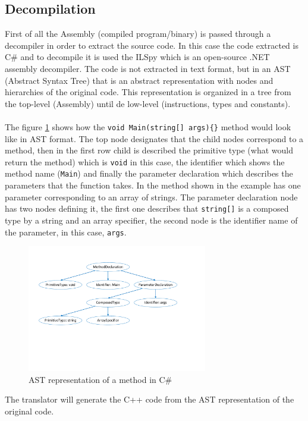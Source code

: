 \subsection{Decompilation}\label{SS:AN-Process-Decom}
First of all the Assembly (compiled program/binary) is passed through a decompiler in order to extract the source code. In this case the code extracted is C\# and to decompile it is used the ILSpy which is an open-source .NET assembly decompiler. The code is not extracted in text format, but in an AST (Abstract Syntax Tree) that is an abstract representation with nodes and hierarchies of the original code. This representation is organized in a tree from the top-level (Assembly) until de low-level (instructions, types and constants).
\\
\\
The figure \ref{fig:AN-AST} shows how the \verb!void Main(string[] args){}! method would look like in AST format. The top node designates that the child nodes correspond to a method, then in the first row child is described the primitive type (what would return the method) which is \verb!void! in this case, the identifier which shows the method name (\verb!Main!) and finally the parameter declaration which describes the parameters that the function takes. In the method shown in the example has one parameter corresponding to an array of strings. The parameter declaration node has two nodes defining it, the first one describes that \verb!string[]! is a composed type by a string and an array specifier, the second node is the identifier name of the parameter, in this case, \verb!args!.
\begin{figure}[H]\begin{center}
 \centering
  \captionsetup{justification=centering}
  \includegraphics[width=0.7\textwidth]{pictures/alternative/csharp_main_ast}
  \caption{AST representation of a method in C\#\label{fig:AN-AST}}
\end{center}\end{figure}
The translator will generate the C++ code from the AST representation of the original code.
